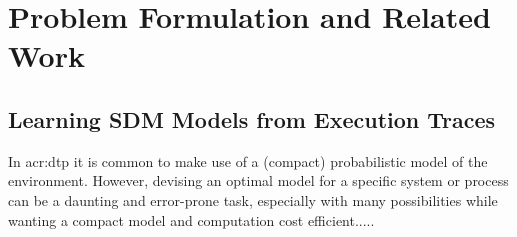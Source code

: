\chapter{Problem Formulation and Related Work}
\label{ch:problem-related-work}


\section{Learning SDM Models from Execution Traces}
\label{sec:learning-models}

In \acrshort{acr:dtp} it is common to make use of a (compact) probabilistic model of the environment.
However, devising an optimal model for a specific system or process can be a daunting and error-prone task, especially with many possibilities while wanting a compact model and computation cost efficient.....




% 

%
%
